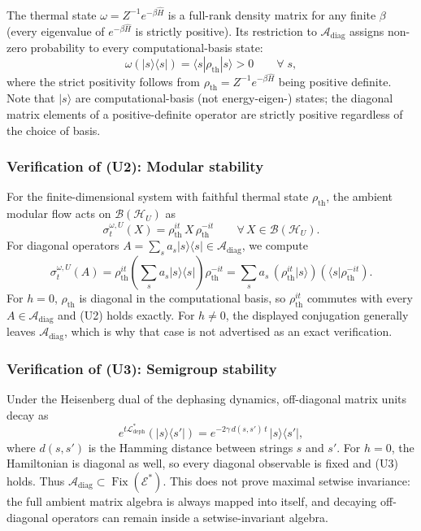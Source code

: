 \documentclass[12pt,a4paper,openany]{book}
\begin{document}
The thermal state $\omega = Z^{-1}e^{-\beta\hat{H}}$ is a full-rank density matrix for any finite $\beta$ (every eigenvalue of $e^{-\beta\hat{H}}$ is strictly positive).
Its restriction to $\mathcal{A}_{\mathrm{diag}}$ assigns non-zero probability to every computational-basis state:
\begin{equation}
\omega(|s\rangle\langle s|) = \langle s | \rho_{\mathrm{th}} | s \rangle > 0 \qquad \forall\; s,
\end{equation}
where the strict positivity follows from $\rho_{\mathrm{th}} = Z^{-1}e^{-\beta\hat{H}}$ being positive definite.
Note that $|s\rangle$ are computational-basis (not energy-eigen-) states; the diagonal matrix elements of a positive-definite operator are strictly positive regardless of the choice of basis.

\subsubsection{Verification of (U2): Modular stability}

For the finite-dimensional system with faithful thermal state $\rho_{\mathrm{th}}$, the ambient modular flow acts on $\mathcal{B}(\mathcal{H}_U)$ as
\begin{equation}
\sigma_t^{\omega,U}(X) = \rho_{\mathrm{th}}^{it}\, X\, \rho_{\mathrm{th}}^{-it} \qquad \forall\, X \in \mathcal{B}(\mathcal{H}_U).
\end{equation}
For diagonal operators $A = \sum_s a_s |s\rangle\langle s| \in \mathcal{A}_{\mathrm{diag}}$, we compute
\begin{equation}
\sigma_t^{\omega,U}(A) = \rho_{\mathrm{th}}^{it} \left(\sum_s a_s |s\rangle\langle s|\right) \rho_{\mathrm{th}}^{-it} = \sum_s a_s\, (\rho_{\mathrm{th}}^{it}|s\rangle)(\langle s|\rho_{\mathrm{th}}^{-it}).
\end{equation}
For $h=0$, $\rho_{\mathrm{th}}$ is diagonal in the computational basis, so $\rho_{\mathrm{th}}^{it}$ commutes with every $A\in\mathcal A_{\mathrm{diag}}$ and (U2) holds exactly.  For $h\ne0$, the displayed conjugation generally leaves $\mathcal A_{\mathrm{diag}}$, which is why that case is not advertised as an exact verification.

\subsubsection{Verification of (U3): Semigroup stability}

Under the Heisenberg dual of the dephasing dynamics, off-diagonal matrix units decay as
\begin{equation}
e^{t\mathcal{L}_{\mathrm{deph}}^*}(|s\rangle\langle s'|) = e^{-2\gamma\, d(s,s')\, t}\, |s\rangle\langle s'|,
\end{equation}
where $d(s, s')$ is the Hamming distance between strings $s$ and $s'$.
For $h=0$, the Hamiltonian is diagonal as well, so every diagonal observable is fixed and (U3) holds.  Thus $\mathcal A_{\mathrm{diag}}\subset\operatorname{Fix}(\mathcal E^*)$.  This does not prove maximal setwise invariance: the full ambient matrix algebra is always mapped into itself, and decaying off-diagonal operators can remain inside a setwise-invariant algebra.
\end{document}
